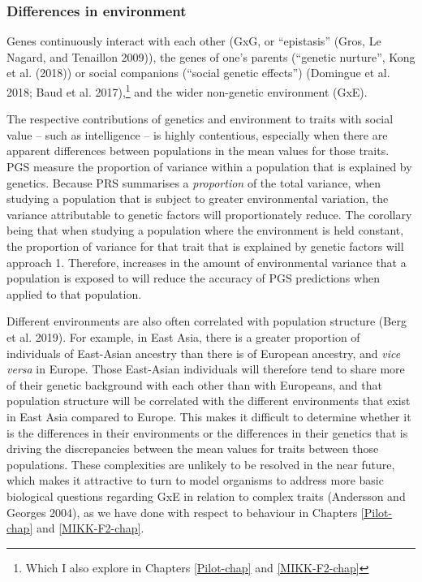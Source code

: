 \documentclass[
]{book}
\begin{document}
\hypertarget{fst-env-sec}{%
\subsubsection{Differences in environment}\label{fst-env-sec}}

Genes continuously interact with each other (GxG, or ``epistasis'' (Gros, Le Nagard, and Tenaillon 2009)), the genes of one's parents (``genetic nurture'', Kong et al. (2018)) or social companions (``social genetic effects'') (Domingue et al. 2018; Baud et al. 2017),\footnote{Which I also explore in Chapters \ref{Pilot-chap} and \ref{MIKK-F2-chap}} and the wider non-genetic environment (GxE).

The respective contributions of genetics and environment to traits with social value -- such as intelligence -- is highly contentious, especially when there are apparent differences between populations in the mean values for those traits. PGS measure the proportion of variance within a population that is explained by genetics. Because PRS summarises a \emph{proportion} of the total variance, when studying a population that is subject to greater environmental variation, the variance attributable to genetic factors will proportionately reduce. The corollary being that when studying a population where the environment is held constant, the proportion of variance for that trait that is explained by genetic factors will approach 1. Therefore, increases in the amount of environmental variance that a population is exposed to will reduce the accuracy of PGS predictions when applied to that population.

Different environments are also often correlated with population structure (Berg et al. 2019). For example, in East Asia, there is a greater proportion of individuals of East-Asian ancestry than there is of European ancestry, and \emph{vice versa} in Europe. Those East-Asian individuals will therefore tend to share more of their genetic background with each other than with Europeans, and that population structure will be correlated with the different environments that exist in East Asia compared to Europe. This makes it difficult to determine whether it is the differences in their environments or the differences in their genetics that is driving the discrepancies between the mean values for traits between those populations. These complexities are unlikely to be resolved in the near future, which makes it attractive to turn to model organisms to address more basic biological questions regarding GxE in relation to complex traits (Andersson and Georges 2004), as we have done with respect to behaviour in Chapters \ref{Pilot-chap} and \ref{MIKK-F2-chap}.
\end{document}
